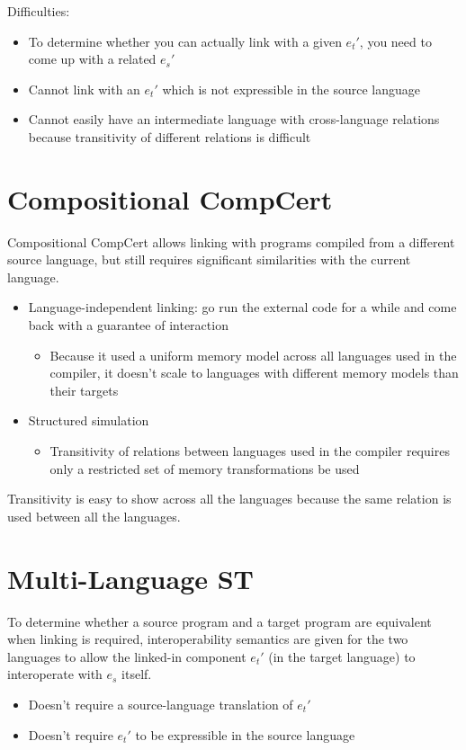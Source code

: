 \documentclass[11pt]{article}
\begin{document}
Difficulties:
\begin{itemize}
\item To determine whether you can actually link with a given $e_t'$,
  you need to come up with a related $e_s'$
\item Cannot link with an $e_t'$ which is not expressible in the
  source language
\item Cannot easily have an intermediate language with cross-language
  relations because transitivity of different relations is difficult
\end{itemize}



\section{Compositional CompCert}
Compositional CompCert allows linking with programs compiled from a
different source language, but still requires significant similarities
with the current language.

\begin{itemize}
\item Language-independent linking:  go run the external code for a
  while and come back with a guarantee of interaction
  \begin{itemize}
  \item Because it used a uniform memory model across all languages
    used in the compiler, it doesn't scale to languages with different
    memory models than their targets
  \end{itemize}
\item Structured simulation
  \begin{itemize}
  \item Transitivity of relations between languages used in the
    compiler requires only a restricted set of memory transformations
    be used
  \end{itemize}
\end{itemize}

Transitivity is easy to show across all the languages because the same
relation is used between all the languages.



\section{Multi-Language ST}
To determine whether a source program and a target program are
equivalent when linking is required, interoperability semantics are
given for the two languages to allow the linked-in component $e_t'$
(in the target language) to interoperate with $e_s$ itself.
\begin{itemize}
\item Doesn't require a source-language translation of $e_t'$
\item Doesn't require $e_t'$ to be expressible in the source language
\end{itemize}
\end{document}
